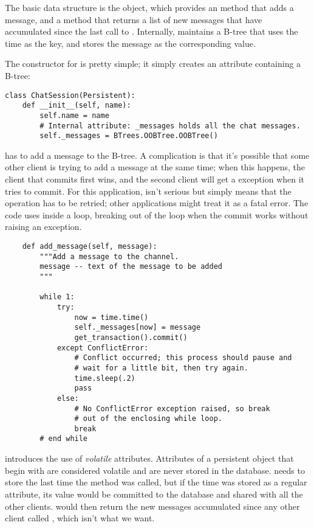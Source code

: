 The basic data structure is the  object,
which provides an  method that adds a
message, and a  method that returns a list
of new messages that have accumulated since the last call to
.  Internally, 
maintains a B-tree that uses the time as the key, and stores the
message as the corresponding value.

The constructor for  is pretty simple; it simply
creates an attribute containing a B-tree:

\begin{verbatim}
class ChatSession(Persistent):
    def __init__(self, name):
        self.name = name
        # Internal attribute: _messages holds all the chat messages.        
        self._messages = BTrees.OOBTree.OOBTree()        
\end{verbatim}

 has to add a message to the
 B-tree.  A complication is that it's possible
that some other client is trying to add a message at the same time;
when this happens, the client that commits first wins, and the second
client will get a  exception when it tries to
commit.  For this application,  isn't serious
but simply means that the operation has to be retried; other
applications might treat it as a fatal error.  The code uses
 inside a  loop,
breaking out of the loop when the commit works without raising an
exception.

\begin{verbatim}
    def add_message(self, message):
        """Add a message to the channel.
        message -- text of the message to be added
        """

        while 1:
            try:
                now = time.time()
                self._messages[now] = message
                get_transaction().commit()
            except ConflictError:
                # Conflict occurred; this process should pause and
                # wait for a little bit, then try again.
                time.sleep(.2)
                pass
            else:
                # No ConflictError exception raised, so break
                # out of the enclosing while loop.
                break
        # end while
\end{verbatim}

 introduces the use of \textit{volatile}
attributes.  Attributes of a persistent object that begin with
 are considered volatile and are never stored in the
database.   needs to store the last time
the method was called, but if the time was stored as a regular
attribute, its value would be committed to the database and shared
with all the other clients.   would then
return the new messages accumulated since any other client called
, which isn't what we want.

